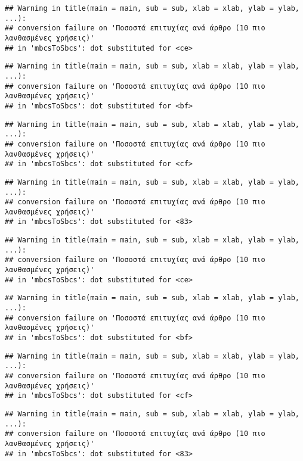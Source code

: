 \documentclass[
]{article}
\begin{document}
\begin{verbatim}
## Warning in title(main = main, sub = sub, xlab = xlab, ylab = ylab, ...):
## conversion failure on 'Ποσοστά επιτυχίας ανά άρθρο (10 πιο λανθασμένες χρήσεις)'
## in 'mbcsToSbcs': dot substituted for <ce>
\end{verbatim}

\begin{verbatim}
## Warning in title(main = main, sub = sub, xlab = xlab, ylab = ylab, ...):
## conversion failure on 'Ποσοστά επιτυχίας ανά άρθρο (10 πιο λανθασμένες χρήσεις)'
## in 'mbcsToSbcs': dot substituted for <bf>
\end{verbatim}

\begin{verbatim}
## Warning in title(main = main, sub = sub, xlab = xlab, ylab = ylab, ...):
## conversion failure on 'Ποσοστά επιτυχίας ανά άρθρο (10 πιο λανθασμένες χρήσεις)'
## in 'mbcsToSbcs': dot substituted for <cf>
\end{verbatim}

\begin{verbatim}
## Warning in title(main = main, sub = sub, xlab = xlab, ylab = ylab, ...):
## conversion failure on 'Ποσοστά επιτυχίας ανά άρθρο (10 πιο λανθασμένες χρήσεις)'
## in 'mbcsToSbcs': dot substituted for <83>
\end{verbatim}

\begin{verbatim}
## Warning in title(main = main, sub = sub, xlab = xlab, ylab = ylab, ...):
## conversion failure on 'Ποσοστά επιτυχίας ανά άρθρο (10 πιο λανθασμένες χρήσεις)'
## in 'mbcsToSbcs': dot substituted for <ce>
\end{verbatim}

\begin{verbatim}
## Warning in title(main = main, sub = sub, xlab = xlab, ylab = ylab, ...):
## conversion failure on 'Ποσοστά επιτυχίας ανά άρθρο (10 πιο λανθασμένες χρήσεις)'
## in 'mbcsToSbcs': dot substituted for <bf>
\end{verbatim}

\begin{verbatim}
## Warning in title(main = main, sub = sub, xlab = xlab, ylab = ylab, ...):
## conversion failure on 'Ποσοστά επιτυχίας ανά άρθρο (10 πιο λανθασμένες χρήσεις)'
## in 'mbcsToSbcs': dot substituted for <cf>
\end{verbatim}

\begin{verbatim}
## Warning in title(main = main, sub = sub, xlab = xlab, ylab = ylab, ...):
## conversion failure on 'Ποσοστά επιτυχίας ανά άρθρο (10 πιο λανθασμένες χρήσεις)'
## in 'mbcsToSbcs': dot substituted for <83>
\end{verbatim}
\end{document}
